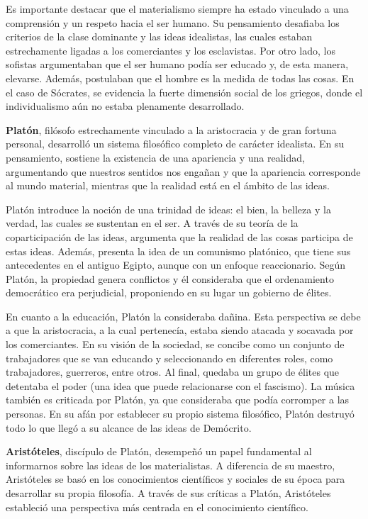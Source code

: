 \documentclass[
  a4paper,
]{article}
\begin{document}
Es importante destacar que el materialismo siempre ha estado vinculado a
una comprensión y un respeto hacia el ser humano. Su pensamiento
desafiaba los criterios de la clase dominante y las ideas idealistas,
las cuales estaban estrechamente ligadas a los comerciantes y los
esclavistas. Por otro lado, los sofistas argumentaban que el ser humano
podía ser educado y, de esta manera, elevarse. Además, postulaban que el
hombre es la medida de todas las cosas. En el caso de Sócrates, se
evidencia la fuerte dimensión social de los griegos, donde el
individualismo aún no estaba plenamente desarrollado.

\textbf{Platón}, filósofo estrechamente vinculado a la aristocracia y de
gran fortuna personal, desarrolló un sistema filosófico completo de
carácter idealista. En su pensamiento, sostiene la existencia de una
apariencia y una realidad, argumentando que nuestros sentidos nos
engañan y que la apariencia corresponde al mundo material, mientras que
la realidad está en el ámbito de las ideas.

Platón introduce la noción de una trinidad de ideas: el bien, la belleza
y la verdad, las cuales se sustentan en el ser. A través de su teoría de
la coparticipación de las ideas, argumenta que la realidad de las cosas
participa de estas ideas. Además, presenta la idea de un comunismo
platónico, que tiene sus antecedentes en el antiguo Egipto, aunque con
un enfoque reaccionario. Según Platón, la propiedad genera conflictos y
él consideraba que el ordenamiento democrático era perjudicial,
proponiendo en su lugar un gobierno de élites.

En cuanto a la educación, Platón la consideraba dañina. Esta perspectiva
se debe a que la aristocracia, a la cual pertenecía, estaba siendo
atacada y socavada por los comerciantes. En su visión de la sociedad, se
concibe como un conjunto de trabajadores que se van educando y
seleccionando en diferentes roles, como trabajadores, guerreros, entre
otros. Al final, quedaba un grupo de élites que detentaba el poder (una
idea que puede relacionarse con el fascismo). La música también es
criticada por Platón, ya que consideraba que podía corromper a las
personas. En su afán por establecer su propio sistema filosófico, Platón
destruyó todo lo que llegó a su alcance de las ideas de Demócrito.

\textbf{Aristóteles}, discípulo de Platón, desempeñó un papel
fundamental al informarnos sobre las ideas de los materialistas. A
diferencia de su maestro, Aristóteles se basó en los conocimientos
científicos y sociales de su época para desarrollar su propia filosofía.
A través de sus críticas a Platón, Aristóteles estableció una
perspectiva más centrada en el conocimiento científico.
\end{document}
